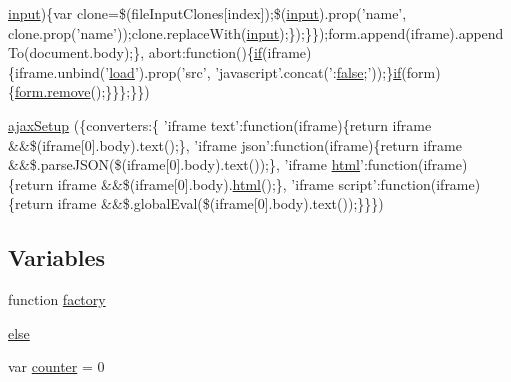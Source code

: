 \begin{DoxyCompactItemize}
$$\hyperlink{validate_8js_a07a2aabd64594dc36dd810cad2669deb}{input})\{var clone=\$(file\+Input\+Clones\mbox{[}index\mbox{]});\$(\hyperlink{validate_8js_a07a2aabd64594dc36dd810cad2669deb}{input}).prop('name', clone.\+prop('name'));clone.\+replace\+With(\hyperlink{validate_8js_a07a2aabd64594dc36dd810cad2669deb}{input});\});\}\});form.\+append(iframe).append\+To(document.\+body);\}, abort\+:function()\{\hyperlink{fullpage_2plugin_8js_a8b98017e64ef036adb9ae327ff94abe1}{if}(iframe)\{iframe.\+unbind('\hyperlink{tinymce_8jquery_8dev_8js_adf5333d4297fab97e9c97a9013678e60}{load}').prop('src', 'javascript'.concat('\+:\hyperlink{validate_8js_a5df37b7f02e5cdc7d9412b7f872b8e01}{false};'));\}\hyperlink{fullpage_2plugin_8js_a8b98017e64ef036adb9ae327ff94abe1}{if}(form)\{\hyperlink{fullpage_2plugin_8min_8js_a3fe72a3812c61d06ea7c5cf2052f3dd2}{form.\+remove}();\}\}\};\}\})
\item 
\hyperlink{jquery_8iframe-transport_8js_a25b94fa537737aae3af6eeeb99654bf8}{ajax\+Setup} (\{converters\+:\{ 'iframe text'\+:function(iframe)\{return iframe \&\&\$(iframe\mbox{[}0\mbox{]}.body).text();\}, 'iframe json'\+:function(iframe)\{return iframe \&\&\$.parse\+J\+S\+O\+N(\$(iframe\mbox{[}0\mbox{]}.body).text());\}, 'iframe \hyperlink{tinymce_8jquery_8dev_8js_ac2090bcf2ff968c0083d5de53a6544f3}{html}'\+:function(iframe)\{return iframe \&\&\$(iframe\mbox{[}0\mbox{]}.body).\hyperlink{tinymce_8jquery_8dev_8js_ac2090bcf2ff968c0083d5de53a6544f3}{html}();\}, 'iframe script'\+:function(iframe)\{return iframe \&\&\$.global\+Eval(\$(iframe\mbox{[}0\mbox{]}.body).text());\}\}\})
\end{DoxyCompactItemize}
\subsection*{Variables}
\begin{DoxyCompactItemize}
\item 
function \hyperlink{jquery_8iframe-transport_8js_abf075bdbe59fd2c3336ed052c9c72b31}{factory}
\item 
\hyperlink{jquery_8iframe-transport_8js_a0544c3fe466e421738dae463968b70ba}{else}
\item 
var \hyperlink{jquery_8iframe-transport_8js_ae2ecbfe6e878f64156d90e6f31875f2c}{counter} = 0
\end{DoxyCompactItemize}


